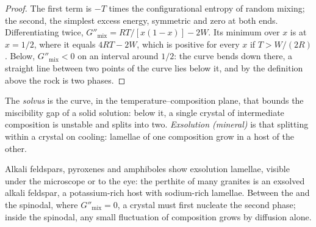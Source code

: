 \begin{proof}
The first term is $-T$ times the configurational entropy of random mixing;
the second, the simplest excess energy, symmetric and zero at both ends.
Differentiating twice, $G''_{\text{mix}} = RT/[x(1 - x)] - 2W$. Its minimum
over $x$ is at $x = 1/2$, where it equals $4RT - 2W$, which is positive for
every $x$ if $T > W/(2R)$. Below, $G''_{\text{mix}} < 0$ on an interval
around $1/2$: the curve bends down there, a straight line between two points
of the curve lies below it, and by the definition above the rock is two
phases.
\end{proof}

\begin{definition}\label{def:b3:petrological-thermodynamics:solvus}
The \emph{solvus} is the curve, in the temperature--composition
plane, that bounds the miscibility gap of a solid solution: below it, a
single crystal of intermediate composition is unstable and splits into two.
\emph{Exsolution (mineral)} is that splitting
within a crystal on cooling: lamellae of one composition grow in a host of the
other.
\end{definition}

Alkali feldspars, pyroxenes and amphiboles show exsolution lamellae,
visible under the microscope or to the eye: the perthite of many granites is
an exsolved alkali feldspar, a potassium-rich host with sodium-rich
lamellae. Between the  and the spinodal, where $G''_{\text{mix}} = 0$,
a crystal must first nucleate the second phase; inside the spinodal, any small
fluctuation of composition grows by diffusion alone.


